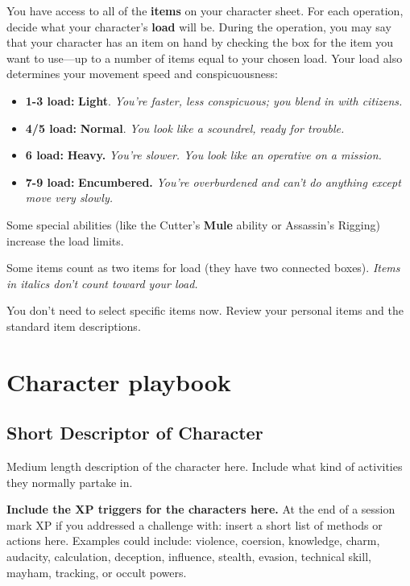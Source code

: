 \documentclass[11pt,oneside]{book}
\newcommand{\gameterm}[1]{\textbf{#1}}
\begin{document}
You have access to all of the \textbf{items} on your character sheet. For each operation, decide what your character’s \textbf{load} will be. During the operation, you may say that your character has an item on hand by checking the box for the item you want to use---up to a number of items equal to your chosen load. Your load also determines your movement speed and conspicuousness:

\begin{itemize}
	\item \gameterm{1-3 load:} \textbf{Light}. \emph{You’re faster, less conspicuous; you blend in with citizens.}
	\item \gameterm{4/5 load: } \textbf{Normal}. \emph{You look like a scoundrel, ready for trouble.}
	\item \gameterm{6 load: } \textbf{Heavy.} \emph{You’re slower. You look like an operative on a mission.}
	\item \gameterm{7-9 load: } \textbf{Encumbered.} \emph{You’re overburdened and can’t do anything except move very slowly.}
\end{itemize}

Some special abilities (like the Cutter’s \gameterm{Mule}  ability or Assassin’s Rigging) increase the load limits.

Some items count as two items for load (they have two connected boxes). \emph{Items in italics don’t count toward your load.}

You don’t need to select specific items now.  Review your personal items and the standard item descriptions.

\chapter{Character playbook}

\section{Short Descriptor of Character}

Medium length description of the character here. Include what kind of activities they normally partake in.

\textbf{Include the XP triggers for the characters here.} At the end of a session mark XP if you addressed a challenge with: insert a short list of methods or actions here. Examples could include: violence, coersion, knowledge, charm, audacity, calculation, deception, influence, stealth, evasion, technical skill, mayham, tracking, or occult powers.
\end{document}
